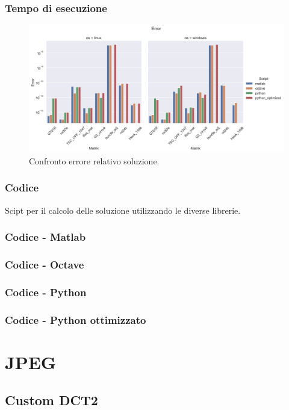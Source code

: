 \documentclass{beamer}
\begin{document}
\begin{frame}
	\frametitle{Tempo di esecuzione}
	\begin{figure}
		\includegraphics[width=1.35\textheight]{assets/error.jpg}
		\caption{Confronto errore relativo soluzione.}
		\label{fig:error}
	\end{figure}
\end{frame}


\begin{frame}
\frametitle{Codice}
Scipt per il calcolo delle soluzione utilizzando le diverse librerie.
\end{frame}


\begin{frame}
	\frametitle{Codice - Matlab}
	
\end{frame}


\begin{frame}
	\frametitle{Codice - Octave}
	
\end{frame}


\begin{frame}
	\frametitle{Codice - Python}
	
\end{frame}


\begin{frame}
	\frametitle{Codice - Python ottimizzato}
	
\end{frame}

\section{JPEG}

\subsection{Custom DCT2}
\end{document}
